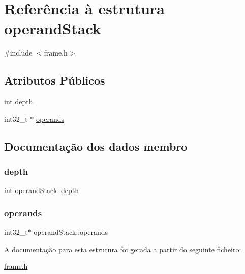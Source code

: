 \hypertarget{structoperand_stack}{}\section{Referência à estrutura operand\+Stack}
\label{structoperand_stack}


{\ttfamily \#include $<$frame.\+h$>$}

\subsection*{Atributos Públicos}
\begin{DoxyCompactItemize}
\item 
int \hyperlink{structoperand_stack_a70c46f6413f90e649d4cac0894b1586f}{depth}
\item 
int32\+\_\+t $\ast$ \hyperlink{structoperand_stack_a3398df9dd2a40d256ef4c97137fe29a0}{operands}
\end{DoxyCompactItemize}


\subsection{Documentação dos dados membro}
\hypertarget{structoperand_stack_a70c46f6413f90e649d4cac0894b1586f}{}\label{structoperand_stack_a70c46f6413f90e649d4cac0894b1586f} 
\subsubsection{\texorpdfstring{depth}{depth}}
{\footnotesize\ttfamily int operand\+Stack\+::depth}

\hypertarget{structoperand_stack_a3398df9dd2a40d256ef4c97137fe29a0}{}\label{structoperand_stack_a3398df9dd2a40d256ef4c97137fe29a0} 
\subsubsection{\texorpdfstring{operands}{operands}}
{\footnotesize\ttfamily int32\+\_\+t$\ast$ operand\+Stack\+::operands}



A documentação para esta estrutura foi gerada a partir do seguinte ficheiro\+:\begin{DoxyCompactItemize}
\item 
\hyperlink{frame_8h}{frame.\+h}\end{DoxyCompactItemize}
